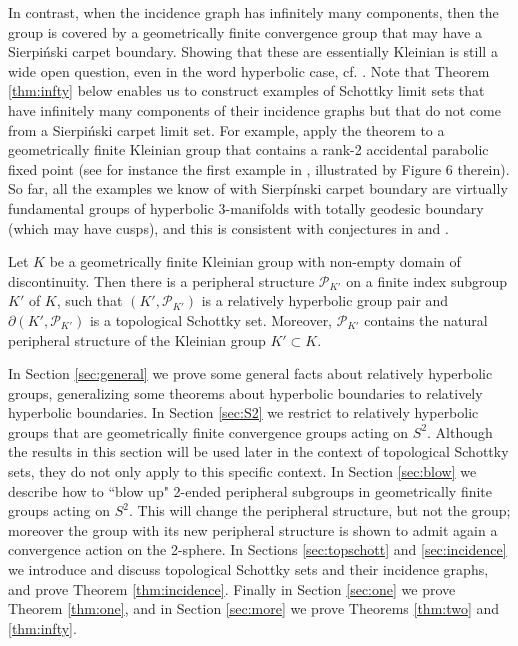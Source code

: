 \documentclass[11pt]{article}
\newenvironment{customthm}[1]
  {\renewcommand\theinnercustomthm{#1}\innercustomthm}
  {\endinnercustomthm}
\theoremstyle{definition}
\begin{document}
In contrast, when the incidence graph has infinitely many components, then the group  is covered by a geometrically finite convergence group that may have a Sierpi\'nski carpet boundary. Showing that these are essentially Kleinian is still a wide open question, even in the word hyperbolic case, cf. \cite{KK}. Note that Theorem \ref{thm:infty} below enables us to construct examples of Schottky limit sets that have infinitely many components of their incidence graphs but that do not come from a Sierpi\'nski carpet limit set. For example, apply the theorem to a geometrically finite Kleinian group that contains a rank-2 accidental parabolic fixed point (see for instance the first example in \cite{Brock}, illustrated by Figure 6 therein).
So far, all the examples we know of with Sierp\'inski carpet boundary are virtually fundamental groups of hyperbolic 3-manifolds with totally geodesic boundary (which may have cusps), and this is consistent with conjectures in \cite{KK} and \cite{hruska:walsh}. 

 \begin{customthm}{D}
     \label{thm:infty}
  Let $K$ be a geometrically finite Kleinian group with non-empty domain of discontinuity. Then there is a peripheral structure  $\mathcal{P}_{K'}$ on a finite index subgroup $K'$ of $K$, such that $(K', \mathcal{P}_{K'})$  is a relatively hyperbolic group pair and $\partial(K', \mathcal{P}_{K'})$ is a topological Schottky set. 
 Moreover, $\mathcal{P}_{K'}$ contains 
 the natural peripheral structure of the Kleinian group $K'\subset K$.
 \end{customthm} 
 

In Section \ref{sec:general} we prove some general facts about relatively hyperbolic groups, generalizing some theorems about hyperbolic boundaries to relatively hyperbolic boundaries. In Section \ref{sec:S2} 
we restrict to relatively hyperbolic groups 
that are geometrically finite convergence groups acting on $S^2$. 
Although the results in this section will be used later in the context of topological Schottky sets, they do not only apply to this specific context.
In Section \ref{sec:blow} we describe how to ``blow up" 2-ended peripheral subgroups in geometrically finite groups acting on $S^2$.  This will change the peripheral structure, but not the group; moreover the group with its new peripheral structure is shown to admit again a convergence action on the 2-sphere. In Sections \ref{sec:topschott} and \ref{sec:incidence} we introduce and discuss topological Schottky sets and their incidence graphs, and prove Theorem \ref{thm:incidence}. Finally in Section \ref{sec:one} we prove Theorem \ref{thm:one}, and in Section \ref{sec:more} we prove Theorems \ref{thm:two} and \ref{thm:infty}. 
\end{document}

